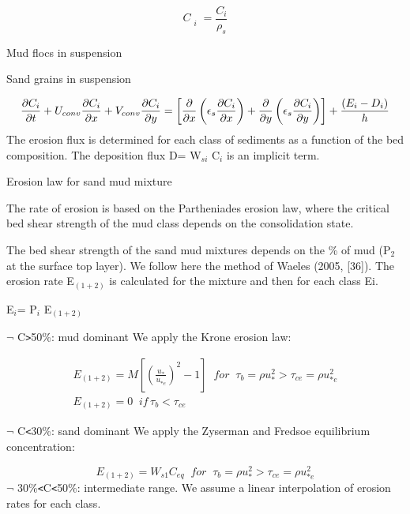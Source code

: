 \begin{equation*}
C_{\substack{ i  \\ }}^{} =\frac{C_{i} }{\rho _{s} } 
\end{equation*}

Mud flocs in suspension

Sand grains in suspension

\begin{equation*}
\frac{\partial C_{i} }{\partial t} +U_{conv} \frac{\partial C_{i} }{\partial
x} +V_{conv} \frac{\partial C_{i} }{\partial y} =\left[ \frac{\partial }{%
\partial x} \left( \epsilon _{s} \frac{\partial C_{i} }{\partial x} \right) +%
\frac{\partial }{\partial y} \left( \epsilon _{s} \frac{\partial C_{i} }{%
\partial y} \right) \right] +\frac{(E_{i} -D_{i} )}{h} 
\end{equation*}%
The erosion flux is determined for each class of sediments as a function of
the bed composition.\newline
The deposition flux D= W$_{si}$ C$_{i}$ is an implicit term.

Erosion law for sand mud mixture

The rate of erosion is based on the Partheniades erosion law, where the
critical bed shear strength of the mud class depends on the consolidation
state.

The bed shear strength of the sand mud mixtures depends on the \% of mud (P$%
_{2}$ at the surface top layer). We follow here the method of Waeles (2005,
[36]).\newline
The erosion rate E$_{(1+2)}$ is calculated for the mixture and then for each
class Ei.

E$_{i}$= P$_{i}$ E$_{(1+2)}$

$\neg$ C\texttt{>}50\%: mud dominant\newline
We apply the Krone erosion law:

\begin{gather*}
E_{(1+2)} =M\left[ \left( \frac{u_{*} }{u_{*e}^{} } \right) ^{2} -1\right]
\;\;for\;\;\tau _{b} =\rho u_{*}^{2} >\tau _{ce} =\rho u_{*e}^{2} \\
E_{(1+2)} =0\;\;if\,\tau _{b} <\tau _{ce}
\end{gather*}

$\neg$ C\texttt{<}30\%: sand dominant\newline
We apply the Zyserman and Fredsoe equilibrium concentration:

\begin{equation*}
E_{(1+2)} =W_{s1} C_{eq} \;\;for\;\;\tau _{b} =\rho u_{*}^{2} >\tau _{ce}
=\rho u_{*e}^{2} 
\end{equation*}
$\neg$ 30\%\texttt{<}C\texttt{<}50\%: intermediate range.\newline
We assume a linear interpolation of erosion rates for each class.

